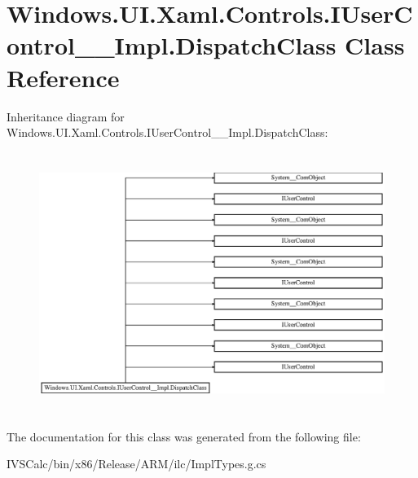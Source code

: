\hypertarget{class_windows_1_1_u_i_1_1_xaml_1_1_controls_1_1_i_user_control_____impl_1_1_dispatch_class}{}\section{Windows.\+U\+I.\+Xaml.\+Controls.\+I\+User\+Control\+\_\+\+\_\+\+Impl.\+Dispatch\+Class Class Reference}
\label{class_windows_1_1_u_i_1_1_xaml_1_1_controls_1_1_i_user_control_____impl_1_1_dispatch_class}
Inheritance diagram for Windows.\+U\+I.\+Xaml.\+Controls.\+I\+User\+Control\+\_\+\+\_\+\+Impl.\+Dispatch\+Class\+:\begin{figure}[H]
\begin{center}
\leavevmode
\includegraphics[height=8.508287cm]{class_windows_1_1_u_i_1_1_xaml_1_1_controls_1_1_i_user_control_____impl_1_1_dispatch_class}
\end{center}
\end{figure}


The documentation for this class was generated from the following file\+:\begin{DoxyCompactItemize}
\item 
I\+V\+S\+Calc/bin/x86/\+Release/\+A\+R\+M/ilc/Impl\+Types.\+g.\+cs\end{DoxyCompactItemize}
